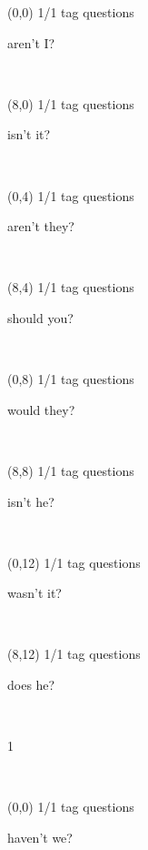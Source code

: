 \documentclass[a4paper]{article}
\newcommand{\mycard}[5]{%
	\vspace{0.1cm}
	\small #1 #2
	\par
	\parbox[t][6.7cm][c]{9.5cm}{%
	\hspace{0.1cm} \Large#3\\
	\normalsize#4 #5
	}
}
\begin{document}
\selectfont

\begin{textblock}{8}(0,0)
\mycard{1/1}{tag questions}{\parbox{9.0cm}{
aren't I?
}}{}{} 
\end{textblock}

\begin{textblock}{8}(8,0)
\mycard{1/1}{tag questions}{\parbox{9.0cm}{
isn't it?
}}{}{} 
\end{textblock}

\begin{textblock}{8}(0,4)
\mycard{1/1}{tag questions}{\parbox{9.0cm}{
aren't they?
}}{}{} 
\end{textblock}

\begin{textblock}{8}(8,4)
\mycard{1/1}{tag questions}{\parbox{9.0cm}{
should you?
}}{}{} 
\end{textblock}

\begin{textblock}{8}(0,8)
\mycard{1/1}{tag questions}{\parbox{9.0cm}{
would they?
}}{}{} 
\end{textblock}

\begin{textblock}{8}(8,8)
\mycard{1/1}{tag questions}{\parbox{9.0cm}{
isn't he?
}}{}{} 
\end{textblock}

\begin{textblock}{8}(0,12)
\mycard{1/1}{tag questions}{\parbox{9.0cm}{
wasn't it?
}}{}{} 
\end{textblock}

\begin{textblock}{8}(8,12)
\mycard{1/1}{tag questions}{\parbox{9.0cm}{
does he?
}}{}{} 
\end{textblock}

\begin{tiny}1\end{tiny}\\
\newpage

\begin{textblock}{8}(0,0)
\mycard{1/1}{tag questions}{\parbox{9.0cm}{
haven't we?
}}{}{} 
\end{textblock}
\end{document}
